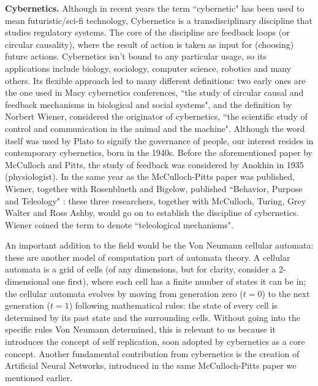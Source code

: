 \documentclass[../main.tex]{subfiles}
\begin{document}
\vspace{4pt}
\textbf{Cybernetics.} Although in recent years the term ``cybernetic" has been used to mean futuristic/sci-fi technology, Cybernetics is a transdisciplinary discipline that studies regulatory systems. The core of the discipline are feedback loops (or circular causality), where the result of action is taken as input for (choosing) future actions. Cybernetics isn't bound to any particular usage, so its applications include biology, sociology, computer science, robotics and many others. Its flexible approach led to many different definitions: two early ones are the one used in Macy cybernetics conferences, ``the study of circular causal and feedback mechanisms in biological and social systems"\cite{steerCyberneticsCircularCausal1952}, and the definition by Norbert Wiener, considered the originator of cybernetics, ``the scientific study of control and communication in the animal and the machine"\cite{wienerCyberneticsControlCommunication1961}. Although the word itself was used by Plato to signify the governance of people, our interest resides in contemporary cybernetics, born in the 1940s. Before the aforementioned paper by McCulloch and Pitts, the study of feedback was considered by Anokhin in 1935 \cite{anokhinProblemsCentrePeriphery1935} (physiologist). In the same year as the McCulloch-Pitts paper was published, Wiener, together with Rosenblueth and Bigelow, published ``Behavior, Purpose and Teleology" \cite{rosenbluethBehaviorPurposeTeleology1943}: these three researchers, together with McCulloch, Turing, Grey Walter and Ross Ashby, would go on to establish the discipline of cybernetics. Wiener coined the term to denote ``teleological mechanisms".

An important addition to the field would be the Von Neumann cellular automata: these are another model of computation part of automata theory. A cellular automata is a grid of cells (of any dimensions, but for clarity, consider a 2-dimensional one first), where each cell has a finite number of states it can be in; the cellular automata evolves by moving from generation zero ($t=0$) to the next generation ($t=1$) following mathematical rules: the state of every cell is determined by its past state and the surrounding cells. Without going into the specific rules Von Neumann determined, this is relevant to us because it introduces the concept of self replication, soon adopted by cybernetics as a core concept. Another fundamental contribution from cybernetics is the creation of Artificial Neural Networks, introduced in the same McCulloch-Pitts paper we mentioned earlier.
\end{document}
